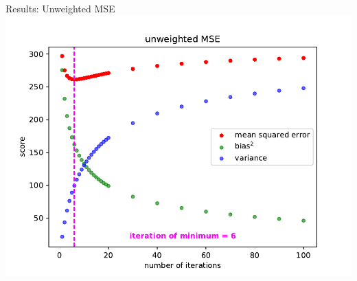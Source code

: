 \documentclass[aspectratio=169]{beamer}
\begin{document}
\begin{frame}{Results: Unweighted MSE}
  \centering
  \includegraphics[height=\textheight]{figures/mse_vs_iter.pdf}
\end{frame}
\end{document}
